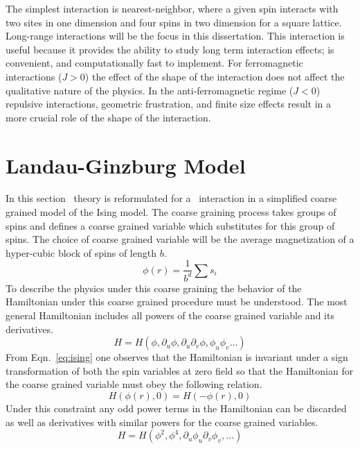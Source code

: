 The simplest interaction is nearest-neighbor, where a given spin interacts with two sites in one dimension and four spins in two dimension for a square lattice. Long-range interactions will be the focus in this dissertation. This interaction is useful because it provides the ability to study long term interaction effects; is convenient, and computationally fast to implement. For ferromagnetic interactions ($J>0$) the effect of the shape of the interaction  does not affect the qualitative nature of the physics. In the anti-ferromagnetic regime ($J<0$) repulsive interactions, geometric frustration, and finite size effects result in a more crucial role of the shape of the interaction.

\section{Landau-Ginzburg Model}
In this section \mf\ theory is reformulated for a \lr\ interaction in a simplified coarse grained model of the Ising model. The coarse graining process takes groups of spins and defines a coarse grained variable which substitutes for this group of spins. The choice of coarse grained variable will be the average magnetization of a hyper-cubic block of spins of length $b$. %
\begin{equation}
	\label{eq:coarse_graining}
	\phi(r) = \frac{1}{b^d} \sum s_i
\end{equation}%
To describe the physics under this coarse graining the behavior of the Hamiltonian under this coarse grained procedure must be understood. The most general Hamiltonian includes all powers of the coarse grained variable and its derivatives.%
\begin{equation}
	\label{eq:hamilt_gen}
H = H(\phi,\partial_u \phi, \partial_u \partial_v \phi,\phi_u \phi_v \ldots) 
\end{equation}%
From Eqn.~\eqref{eq:ising} one observes that the Hamiltonian is invariant under a sign transformation of both the spin variables at zero field so that the Hamiltonian for the coarse grained variable must obey the following relation.%
\begin{equation}
	\label{eq:hamilt_gen0}
H(\phi(r),0) = H(-\phi(r),0) 
\end{equation}%
Under this constraint any odd power terms in the Hamiltonian can be discarded as well as derivatives with similar powers for the coarse grained variables. %
\begin{equation}
	\label{eq:hamilt_gen1}
H = H( \phi^2, \phi^4, \partial_u \phi_u \partial_v \phi_v, \ldots)
\end{equation}%
